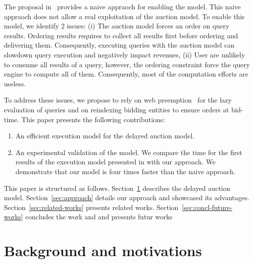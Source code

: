 \documentclass[runningheads]{llncs}
\begin{document}
The proposal in~\cite{DBLP:conf/www/GrubenmannBMS18}  provides a naive appraoch for enabling the model. 
This naive appraoch does not allow a real exploitation of the auction model.
To enable this model, we  identify 2 issues:
(i) The auction model forces an order on query results. Ordering results requires to collect all results first before ordering
and delivering them. Consequently,  executing queries with the auction
model can slowdown query execution and negatively impact revenues,
(ii) User are unlikely to consume all results of a query, however, the
ordering constraint force the query engine to compute all of
them. Consequently, most of the computation efforts are  useless.

To address these issues, we propose to rely on web
preemption~\cite{DBLP:conf/www/MinierSM19} for the lazy evaluation of
queries and on reindexing bidding entities to ensure orders at
bid-time. This paper presents the following contributions:
\begin{enumerate}
\item An efficient execution model for the delayed auction model.
\item An experimental validation of the model. We compare the time for
  the first results of the execution model presented in
  \cite{DBLP:conf/www/GrubenmannBMS18} with our approach. We
  demonstrate that our model is four times faster than the naive approach.
  
  \end{enumerate}

This paper is structured as follows. Section~\ref{sec:backgr-motiv} describes the delayed auction model. 
Section~\ref{sec:approach} details our approach and showcased its
advantages. Section~\ref{sec:related-works} presents  
related works. Section~\ref{sec:concl-future-works} concludes the work and  and presents futur works

\section{Background and motivations}
\label{sec:backgr-motiv}
\end{document}
